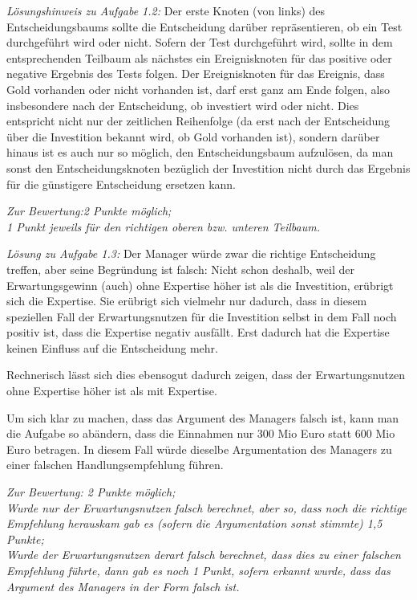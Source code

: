 \documentclass[10pt, a4paper, german]{article}
\numberwithin {equation}{section}
\begin{document}
{\em Lösungshinweis zu Aufgabe 1.2:} Der erste Knoten (von links) des
Entscheidungsbaums sollte die Entscheidung darüber repräsentieren, ob ein Test
durchgeführt wird oder nicht. Sofern der Test durchgeführt wird, sollte in dem
entsprechenden Teilbaum als nächstes ein Ereignisknoten für das positive oder
negative Ergebnis des Tests folgen. Der Ereignisknoten für das Ereignis, dass
Gold vorhanden oder nicht vorhanden ist, darf erst ganz am Ende folgen, also
insbesondere nach der Entscheidung, ob investiert wird oder nicht. Dies
entspricht nicht nur der zeitlichen Reihenfolge (da erst nach der Entscheidung
über die Investition bekannt wird, ob Gold vorhanden ist), sondern darüber
hinaus ist es auch nur so möglich, den Entscheidungsbaum aufzulösen, da man
sonst den Entscheidungsknoten bezüglich der Investition nicht durch das
Ergebnis für die günstigere Entscheidung ersetzen kann.

\vspace{0.25cm}

{\em Zur Bewertung:2 Punkte möglich; \\
1 Punkt jeweils für den richtigen oberen bzw. unteren Teilbaum.}


\vspace{0.5cm}

{\em Lösung zu Aufgabe 1.3:} Der Manager würde zwar die richtige Entscheidung
treffen, aber seine Begründung ist falsch: Nicht schon deshalb, weil der
Erwartungsgewinn (auch) ohne Expertise höher ist als die Investition, erübrigt
sich die Expertise. Sie erübrigt sich vielmehr nur dadurch, dass in diesem
speziellen Fall der Erwartungsnutzen für die Investition selbst in dem Fall
noch positiv ist, dass die Expertise negativ ausfällt. Erst dadurch hat die
Expertise keinen Einfluss auf die Entscheidung mehr.

Rechnerisch lässt sich dies ebensogut dadurch zeigen, dass der Erwartungsnutzen
ohne Expertise höher ist als mit Expertise.

Um sich klar zu machen, dass das Argument des Managers falsch ist, kann man die
Aufgabe so abändern, dass die Einnahmen nur 300 Mio Euro statt 600 Mio Euro
betragen. In diesem Fall würde dieselbe Argumentation des Managers zu einer
falschen Handlungsempfehlung führen.

\vspace{0.25cm}

{\em Zur Bewertung: 2 Punkte möglich;\\
Wurde nur der Erwartungsnutzen falsch berechnet, aber so, dass noch die
richtige Empfehlung herauskam gab es (sofern die Argumentation sonst stimmte)
1,5 Punkte;\\
Wurde der Erwartungsnutzen derart falsch berechnet, dass dies zu einer falschen
Empfehlung führte, dann gab es noch 1 Punkt, sofern erkannt wurde, dass
das Argument des Managers in der Form falsch ist. }
\end{document}
